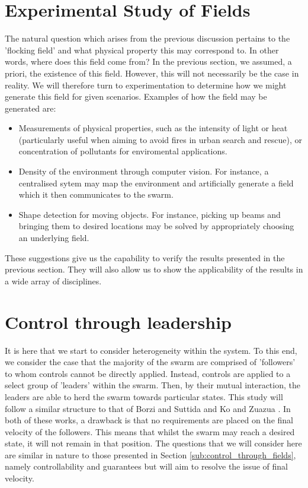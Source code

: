 \documentclass[../sample.tex]{subfiles}
\begin{document}
	
	\section{Experimental Study of Fields} %
	\label{sec:experimental_study_of_fields}
	
	The natural question which arises from the previous discussion pertains to the 'flocking field' and
	what physical property this may correspond to. In other words, where does this field come from? In
	the previous section, we assumed, a priori, the existence of this field. However, this will not
	necessarily be the case in reality. We will therefore turn to experimentation to determine how we might
	generate this field for given scenarios. Examples of how the field may be generated are:

	\begin{itemize}
		\item Measurements of physical properties, such as the intensity of light or heat 
		(particularly useful when aiming to avoid fires in urban search and rescue), or
		concentration of pollutants for enviromental applications.
		\item Density of the environment through computer vision. For instance, a centralised sytem may map the environment and artificially generate a field which it then communicates to the swarm.
		\item Shape detection for moving objects. For instance, picking up beams and bringing
		them to desired locations may be solved by appropriately choosing an underlying field.
	\end{itemize}

	These suggestions give us the capability to verify the results presented in the previous
	section. They will also allow us to show the applicability of the results in a wide array of
	disciplines.

	\section{Control through leadership} %
	\label{sec:control_through_leadership}
	
	It is here that we start to consider heterogeneity within the system. To this end, we consider the
	case that the majority of the swarm are comprised of 'followers' to whom controls cannot be
	directly applied. Instead, controls are applied to a select group of 'leaders' within the swarm.
	Then, by their mutual interaction, the leaders are able to herd the swarm towards particular
	states. This study will follow a similar structure to that of Borzi and Suttida  \cite{Borzi2015}
	and Ko and Zuazua \cite{Ko2019}. In both of these works, a drawback is that no requirements are
	placed on the final velocity of the followers. This means that whilst the swarm may reach a desired
	state, it will not remain in that position. The questions that we will consider here are similar in
	nature to those presented in Section \ref{sub:control_through_fields}, namely controllability and
	guarantees but will aim to resolve the issue of final velocity.
\end{document}
